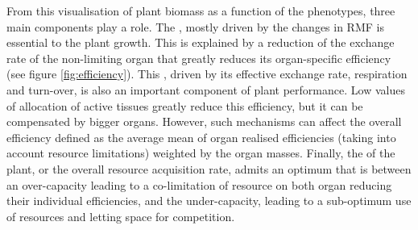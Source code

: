 From this visualisation of plant biomass as a function of the phenotypes, three main components play a role. The , mostly driven by the changes in RMF is essential to the plant growth. This is explained by a reduction of the exchange rate of the non-limiting organ that greatly reduces its organ-specific efficiency (see figure \ref{fig:efficiency}). This , driven by its effective exchange rate, respiration and turn-over, is also an important component of plant performance. Low values of allocation of active tissues greatly reduce this efficiency, but it can be compensated by bigger organs. However, such mechanisms can affect the overall efficiency defined as the average mean of organ realised efficiencies (taking into account resource limitations) weighted by the organ masses. Finally, the  of the plant, or the overall resource acquisition rate, admits an optimum that is between an over-capacity leading to a co-limitation of resource on both organ reducing their individual efficiencies, and the under-capacity, leading to a sub-optimum use of resources and letting space for competition.






%
%
%
%
%

